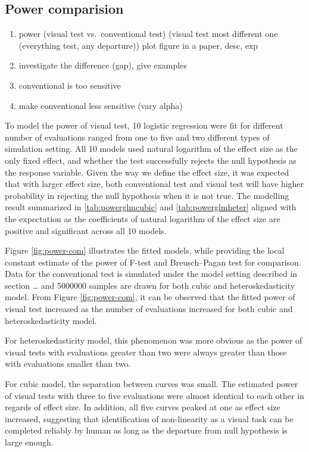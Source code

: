 \documentclass[]{interact}
\theoremstyle{plain}%
\theoremstyle{definition}
\theoremstyle{remark}
\def\tightlist{}
\begin{document}
\hypertarget{power-comparision}{%
\subsection{Power comparision}\label{power-comparision}}

\begin{enumerate}
\def\labelenumi{\arabic{enumi}.}
\tightlist
\item
  power (visual test vs.~conventional test) (visual test most different
  one (everything test, any departure)) plot figure in a paper, desc,
  exp
\item
  investigate the difference (gap), give examples
\item
  conventional is too sensitive
\item
  make conventional less sensitive (vary alpha)
\end{enumerate}

To model the power of visual test, 10 logistic regression were fit for
different number of evaluations ranged from one to five and two
different types of simulation setting. All 10 models used natural
logarithm of the effect size as the only fixed effect, and whether the
test successfully rejects the null hypothesis as the response variable.
Given the way we define the effect size, it was expected that with
larger effect size, both conventional test and visual test will have
higher probability in rejecting the null hypothesis when it is not true.
The modelling result summarized in \ref{tab:powerglmcubic} and
\ref{tab:powerglmheter} aligned with the expectation as the coefficients
of natural logarithm of the effect size are positive and significant
across all 10 models.

Figure \ref{fig:power-com} illustrates the fitted models, while
providing the local constant estimate of the power of F-test and
Breusch--Pagan test for comparison. Data for the conventional test is
simulated under the model setting described in section \ldots{} and
5000000 samples are drawn for both cubic and heteroskedasticity model.
From Figure \ref{fig:power-com}, it can be observed that the fitted
power of visual test increased as the number of evaluations increased
for both cubic and heteroskedasticity model.

For heteroskedasticity model, this phenomenon was more obvious as the
power of visual tests with evaluations greater than two were always
greater than those with evaluations smaller than two.

For cubic model, the separation between curves was small. The estimated
power of visual tests with three to five evaluations were almost
identical to each other in regards of effect size. In addition, all five
curves peaked at one as effect size increased, suggesting that
identification of non-linearity as a visual task can be completed
reliably by human as long as the departure from null hypothesis is large
enough.
\end{document}
